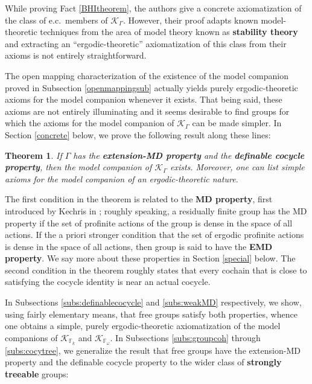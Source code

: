 \documentclass[12pt]{amsart}
\newtheorem*{thm*}{Theorem}
\theoremstyle{definition}
\def\bb{\mathbb}
\def\bb{\mathbb}
\def\cal{\mathcal}
\begin{document}
While proving Fact \ref{BHItheorem}, the authors give a concrete axiomatization of the class of e.c.\ members of $\cal K_\Gamma$.  However, their proof adapts known model-theoretic techniques from the area of model theory known as \textbf{stability theory} and extracting an ``ergodic-theoretic'' axiomatization of this class from their axioms is not entirely straightforward.

The open mapping characterization of the existence of the model companion proved in Subsection \ref{openmappingsub} actually yields purely ergodic-theoretic axioms for the model companion whenever it exists.  That being said, these axioms are not entirely illuminating and it seems desirable to find groups for which the axioms for the model companion of $\cal K_\Gamma$ can be made simpler. In Section \ref{concrete} below, we prove the following result along these lines:

\begin{thm*}
    If $\Gamma$ has the \textbf{extension-MD property} and the \textbf{definable cocycle property}, then the model companion of $\cal K_\Gamma$ exists.  Moreover, one can list simple axioms for the model companion of an ergodic-theoretic nature. 
\end{thm*}

The first condition in the theorem is related to the \textbf{MD property}, first introduced by Kechris in \cite{kechrisweak}; roughly speaking, a residually finite group has the MD property if the set of profinite actions of the group is dense in the space of all actions.  If the a priori stronger condition that the set of ergodic profinite actions is dense in the space of all actions, then group is said to have the \textbf{EMD property}.  We say more about these properties in Section \ref{special} below.  The second condition in the theorem roughly states that every cochain that is close to satisfying the cocycle identity is near an actual cocycle. 

In Subsections \ref{subs:definablecocycle} and \ref{subs:weakMD} respectively, we show, using fairly elementary means, that free groups satisfy both properties, whence one obtains a simple, purely ergodic-theoretic axiomatization of the model companions of $\cal K_{\bb F_k}$ and $\cal K_{\bb F_\omega}$.    In Subsections \ref{subs:groupcoh} through \ref{subs:cocytree}, we generalize the result that free groups have the extension-MD property and the definable cocycle property to the wider class of \textbf{strongly treeable} groups:
\end{document}
